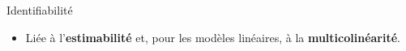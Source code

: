 \begin{frame}{\vskip -0.2cm \LARGE Identifiabilit\'e}
\begin{itemize}
\begin{equation*}
\begin{array}{c}
		\textnormal{\tiny \# param\`etres de la} \\
		\textnormal{\tiny distribution des} \\
		\textnormal{\tiny observations}
	\end{array}\!\!\right)
	\geq
	\left(\!\!\begin{array}{c}
		\textnormal{\tiny \# param\`etres du} \\
		\textnormal{\tiny mod\`ele statistique}
	\end{array}\!\!\right)
	\;\;\not\Longrightarrow\;\;
	\begin{array}{c}
		\textnormal{\scriptsize mod\`ele} \\
		\textnormal{\scriptsize identifiable.}
	\end{array}
	\end{equation*}
	\vskip 0.2cm
\pause\item
	\footnotesize
	Li\'ee \`a l'\textbf{estimabilit\'e} et, pour les mod\`eles lin\'eaires, \`a la \textbf{multicolin\'earit\'e}.
\end{itemize}

\end{frame}
\normalsize

